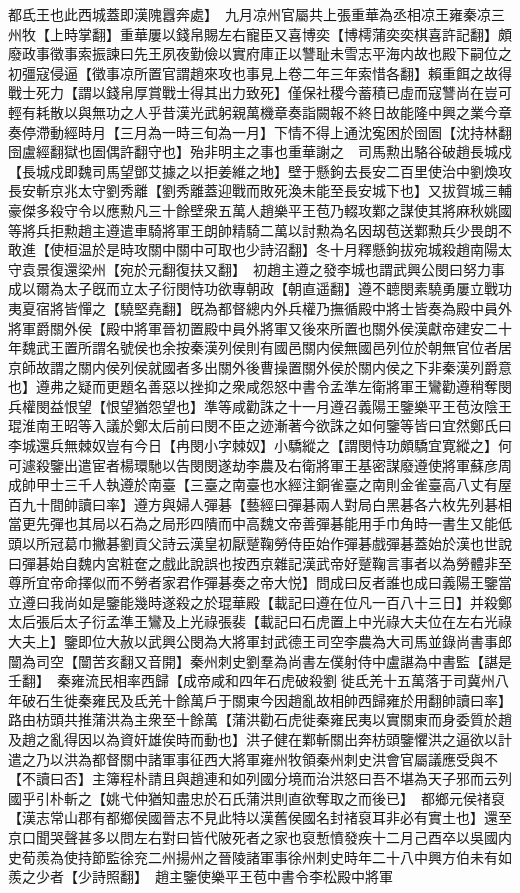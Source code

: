 都氐王也此西城蓋即漢隗囂奔處】　九月凉州官屬共上張重華為丞相凉王雍秦凉三州牧【上時掌翻】重華屢以錢帛賜左右寵臣又喜博奕【博樗蒲奕奕棋喜許記翻】頗廢政事徵事索振諫曰先王夙夜勤儉以實府庫正以讐耻未雪志平海内故也殿下嗣位之初彊寇侵逼【徵事凉所置官謂趙來攻也事見上卷二年三年索惜各翻】賴重餌之故得戰士死力【謂以錢帛厚賞戰士得其出力致死】僅保社稷今蓄積已虛而寇讐尚在豈可輕有耗散以與無功之人乎昔漢光武躬親萬機章奏詣闕報不終日故能隆中興之業今章奏停滯動經時月【三月為一時三旬為一月】下情不得上通沈寃困於囹圄【沈持林翻囹盧經翻獄也圄偶許翻守也】殆非明主之事也重華謝之　司馬勲出駱谷破趙長城戍【長城戍即魏司馬望鄧艾據之以拒姜維之地】壁于懸鉤去長安二百里使治中劉煥攻長安斬京兆太守劉秀離【劉秀離蓋迎戰而敗死渙未能至長安城下也】又拔賀城三輔豪傑多殺守令以應勲凡三十餘壁衆五萬人趙樂平王苞乃輟攻鄴之謀使其將麻秋姚國等將兵拒勲趙主遵遣車騎將軍王朗帥精騎二萬以討勲為名因刼苞送鄴勲兵少畏朗不敢進【使桓温於是時攻關中關中可取也少詩沼翻】冬十月釋懸鉤拔宛城殺趙南陽太守袁景復還梁州【宛於元翻復扶又翻】　初趙主遵之發李城也謂武興公閔曰努力事成以爾為太子旣而立太子衍閔恃功欲專朝政【朝直遥翻】遵不聼閔素驍勇屢立戰功夷夏宿將皆憚之【驍堅堯翻】旣為都督總内外兵權乃撫循殿中將士皆奏為殿中員外將軍爵關外侯【殿中將軍晉初置殿中員外將軍又後來所置也關外侯漢獻帝建安二十年魏武王置所謂名號侯也余按秦漢列侯則有國邑關内侯無國邑列位於朝無官位者居京師故謂之關内侯列侯就國者多出關外後曹操置關外侯於關内侯之下非秦漢列爵意也】遵弗之疑而更題名善惡以挫抑之衆咸怨怒中書令孟準左衛將軍王鸞勸遵稍奪閔兵權閔益恨望【恨望猶怨望也】準等咸勸誅之十一月遵召義陽王鑒樂平王苞汝陰王琨淮南王昭等入議於鄭太后前曰閔不臣之迹漸著今欲誅之如何鑒等皆曰宜然鄭氏曰李城還兵無棘奴豈有今日【冉閔小字棘奴】小驕縱之【謂閔恃功頗驕宜寛縱之】何可遽殺鑒出遣宦者楊環馳以告閔閔遂劫李農及右衛將軍王基密謀廢遵使將軍蘇彦周成帥甲士三千人執遵於南臺【三臺之南臺也水經注銅雀臺之南則金雀臺高八丈有屋百九十間帥讀曰率】遵方與婦人彈碁【藝經曰彈碁兩人對局白黑碁各六枚先列碁相當更先彈也其局以石為之局形四隤而中高魏文帝善彈碁能用手巾角時一書生又能低頭以所冠葛巾撇碁劉貢父詩云漢皇初厭蹵鞠勞侍臣始作彈碁戲彈碁蓋始於漢也世說曰彈碁始自魏内宮粧奩之戲此說誤也按西京雜記漢武帝好蹵鞠言事者以為勞體非至尊所宜帝命擇似而不勞者家君作彈碁奏之帝大悦】問成曰反者誰也成曰義陽王鑒當立遵曰我尚如是鑒能幾時遂殺之於琨華殿【載記曰遵在位凡一百八十三日】并殺鄭太后張后太子衍孟準王鸞及上光祿張裴【載記曰石虎置上中光祿大夫位在左右光祿大夫上】鑒即位大赦以武興公閔為大將軍封武德王司空李農為大司馬並錄尚書事郎闓為司空【闓苦亥翻又音開】秦州刺史劉羣為尚書左僕射侍中盧諶為中書監【諶是壬翻】　秦雍流民相率西歸【成帝咸和四年石虎破殺劉徙氐羌十五萬落于司冀州八年破石生徙秦雍民及氐羌十餘萬戶于關東今因趙亂故相帥西歸雍於用翻帥讀曰率】路由枋頭共推蒲洪為主衆至十餘萬【蒲洪勸石虎徙秦雍民夷以實關東而身委質於趙及趙之亂得因以為資奸雄俟時而動也】洪子健在鄴斬關出奔枋頭鑒懼洪之逼欲以計遣之乃以洪為都督關中諸軍事征西大將軍雍州牧領秦州刺史洪會官屬議應受與不【不讀曰否】主簿程朴請且與趙連和如列國分境而治洪怒曰吾不堪為天子邪而云列國乎引朴斬之【姚弋仲猶知盡忠於石氏蒲洪則直欲奪取之而後已】　都鄉元侯禇裒【漢志常山郡有都鄉侯國晉志不見此特以漢舊侯國名封禇裒耳非必有實土也】還至京口聞哭聲甚多以問左右對曰皆代陂死者之家也裒慙憤發疾十二月己酉卒以吳國内史荀羨為使持節監徐兖二州揚州之晉陵諸軍事徐州刺史時年二十八中興方伯未有如羨之少者【少詩照翻】　趙主鑒使樂平王苞中書令李松殿中將軍